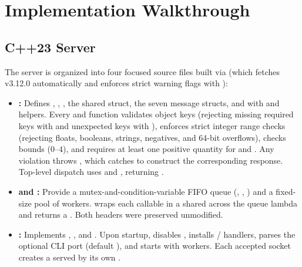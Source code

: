 \documentclass{../latex/utmreport}
\begin{document}
\chapter{Implementation Walkthrough}

\section{C++23 Server}
The server is organized into four focused source files built via  (which fetches  v3.12.0 automatically and enforces strict warning flags with ):

\begin{itemize}
  \item \textbf{:} Defines , , , the shared  struct, the seven message structs, and  with   and  helpers. Every  and  function validates object keys (rejecting missing required keys with  and unexpected keys with ), enforces strict integer range checks (rejecting floats, booleans, strings, negatives, and 64-bit overflows), checks  bounds ($0\text{--}4$), and requires at least one positive quantity for  and . Any violation throws , which  catches to construct the corresponding  response. Top-level dispatch uses  and , returning .
  \item \textbf{ and :} Provide a mutex-and-condition-variable FIFO queue (, , ) and a fixed-size pool of  workers.  wraps each callable in a  shared across the queue lambda and returns a . Both headers were preserved unmodified.
  \item \textbf{:} Implements , , and . Upon startup,  disables , installs / handlers, parses the optional CLI port (default ), and starts  with  workers. Each accepted socket creates a  served by its own .
\end{itemize}
\end{document}
